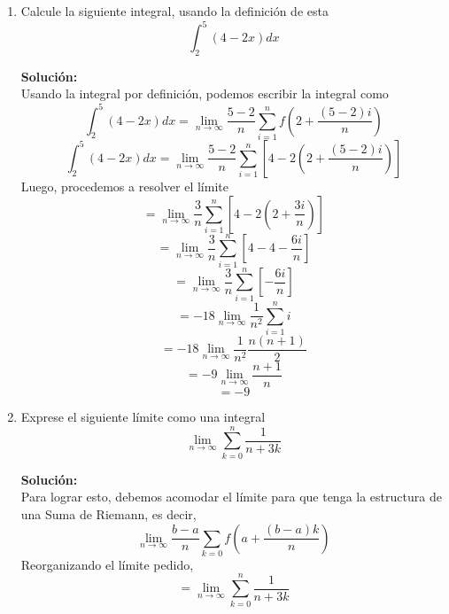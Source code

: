 \documentclass[12pt]{article}
\newenvironment{solucion}
{\begin{mdframed}[backgroundcolor=black!10]
		{\bf Solución:}\\
	}
	{
	\end{mdframed}
}
\newenvironment{preguntas}
{\begin{enumerate}\itemsep12pt
	}
	{
	\end{enumerate}
}
\newcommand{\ra}{\rightarrow}
\begin{document}
\begin{preguntas}
\begin{solucion}
\begin{enumerate}[a)]
\item $a_n = \dfrac{3^n+7}{5^n-3}$\\
			\\
			Como antes, vemos el límite del término general
			$$\lim\limits_{n\ra \infty} a_n = \lim\limits_{n\ra \infty} \dfrac{3^n+7}{5^n-3} \stackrel{L'H}{=} \lim\limits_{n\ra \infty} \dfrac{ln(3)3^n}{ln(5)5^n} = \lim\limits_{n\ra \infty} \dfrac{ln(3)}{ln(5)} \left(\dfrac{3}{5}\right)^n = 0$$
\item $a_n = \dfrac{n^3-n}{7n^3+6}$\\
			\\
			$$\lim\limits_{n\ra \infty} a_n = \lim\limits_{n\ra \infty} \dfrac{n^3-n}{7n^3+6} \stackrel{L'H}{=} \lim\limits_{n\ra \infty} \dfrac{3n^2-1}{21n^2}
			\stackrel{L'H}{=} \lim\limits_{n\ra \infty} \dfrac{6n}{42n} = \dfrac{1}{7}$$
\end{enumerate}
\end{solucion}
\item Calcule la siguiente integral, usando la definición de esta
	$$\int_2^5(4-2x)dx$$
\begin{solucion}
Usando la integral por definición, podemos escribir la integral como
		$$\int_2^5(4-2x)dx = \lim\limits_{n\ra \infty} \dfrac{5-2}{n} \sum\limits_{i=1}^n f \left(2+\dfrac{(5-2)i}{n}\right) $$
		$$\int_2^5(4-2x)dx = \lim\limits_{n\ra \infty} \dfrac{5-2}{n} \sum\limits_{i=1}^n \left[4-2 \left(2+\dfrac{(5-2)i}{n}\right)\right]$$
		Luego, procedemos a resolver el límite
		$$= \lim\limits_{n\ra \infty} \dfrac{3}{n} \sum\limits_{i=1}^n \left[4-2 \left(2+\dfrac{3i}{n}\right)\right]$$
		$$= \lim\limits_{n\ra \infty} \dfrac{3}{n} \sum\limits_{i=1}^n \left[4-4-\dfrac{6i}{n}\right]$$
		$$= \lim\limits_{n\ra \infty} \dfrac{3}{n} \sum\limits_{i=1}^n \left[-\dfrac{6i}{n}\right]$$
		$$= -18\lim\limits_{n\ra \infty} \dfrac{1}{n^2} \sum\limits_{i=1}^n i$$
		$$= -18\lim\limits_{n\ra \infty} \dfrac{1}{n^2} \dfrac{n(n+1)}{2}$$
		$$= -9\lim\limits_{n\ra \infty} \dfrac{n+1}{n}$$
		$$= -9$$
\end{solucion}
\item Exprese el siguiente límite como una integral
	$$\lim\limits_{n\ra \infty} \sum\limits_{k=0}^n \dfrac{1}{n+3k}$$
\begin{solucion}
Para lograr esto, debemos acomodar el límite para que tenga la estructura de una Suma de Riemann, es decir,
		$$\lim\limits_{n \ra \infty} \dfrac{b-a}{n}\sum\limits_{k=0} f\left(a+\dfrac{(b-a)k}{n}\right)$$
		Reorganizando el límite pedido,
		$$ = \lim\limits_{n\ra \infty} \sum\limits_{k=0}^n \dfrac{1}{n+3k}$$

\end{solucion}
\end{preguntas}
\end{document}
